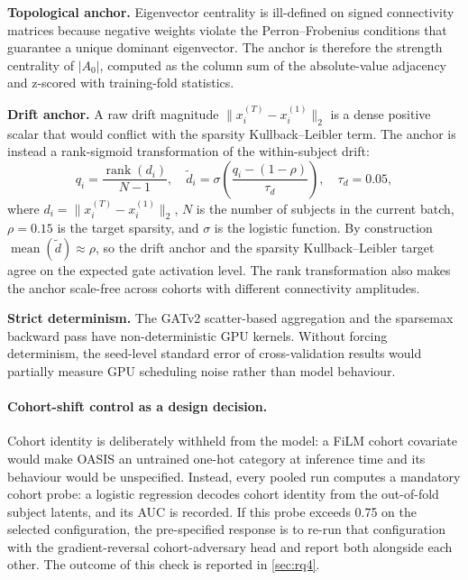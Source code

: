 \textbf{Topological anchor.} Eigenvector centrality is ill-defined on signed connectivity
matrices because negative weights violate the Perron--Frobenius conditions that guarantee
a unique dominant eigenvector. The anchor is therefore the strength centrality of $|A_0|$,
computed as the column sum of the absolute-value adjacency and z-scored with training-fold
statistics.

\textbf{Drift anchor.} A raw drift magnitude $\|x_i^{(T)} - x_i^{(1)}\|_2$ is a dense
positive scalar that would conflict with the sparsity Kullback--Leibler term. The anchor
is instead a rank-sigmoid transformation of the within-subject drift:
\begin{equation}
  q_i = \frac{\operatorname{rank}(d_i)}{N - 1},
  \quad
  \tilde{d}_i = \sigma\!\left(\frac{q_i - (1 - \rho)}{\tau_d}\right),
  \quad \tau_d = 0.05,
  \label{eq:drift-anchor}
\end{equation}
where $d_i = \|x_i^{(T)} - x_i^{(1)}\|_2$, $N$ is the number of subjects in the
current batch, $\rho = 0.15$ is the target sparsity, and $\sigma$ is the logistic
function. By construction $\operatorname{mean}(\tilde{d}) \approx \rho$, so the drift
anchor and the sparsity Kullback--Leibler target agree on the expected gate activation
level. The rank transformation also makes the anchor scale-free across cohorts with
different connectivity amplitudes.

\textbf{Strict determinism.} The GATv2 scatter-based aggregation and the sparsemax
backward pass have non-deterministic GPU kernels. Without forcing determinism, the
seed-level standard error of cross-validation results would partially measure GPU
scheduling noise rather than model behaviour.

\paragraph{Cohort-shift control as a design decision.}
Cohort identity is deliberately withheld from the model: a FiLM cohort covariate would
make \ac{OASIS} an untrained one-hot category at inference time and its behaviour would
be unspecified. Instead, every pooled run computes a mandatory cohort probe: a logistic
regression decodes cohort identity from the out-of-fold subject latents, and its \ac{AUC}
is recorded. If this probe exceeds 0.75 on the selected
configuration, the pre-specified response is to re-run that configuration with the gradient-reversal
cohort-adversary head and report both alongside each other. The outcome of this check is
reported in \autoref{sec:rq4}.


